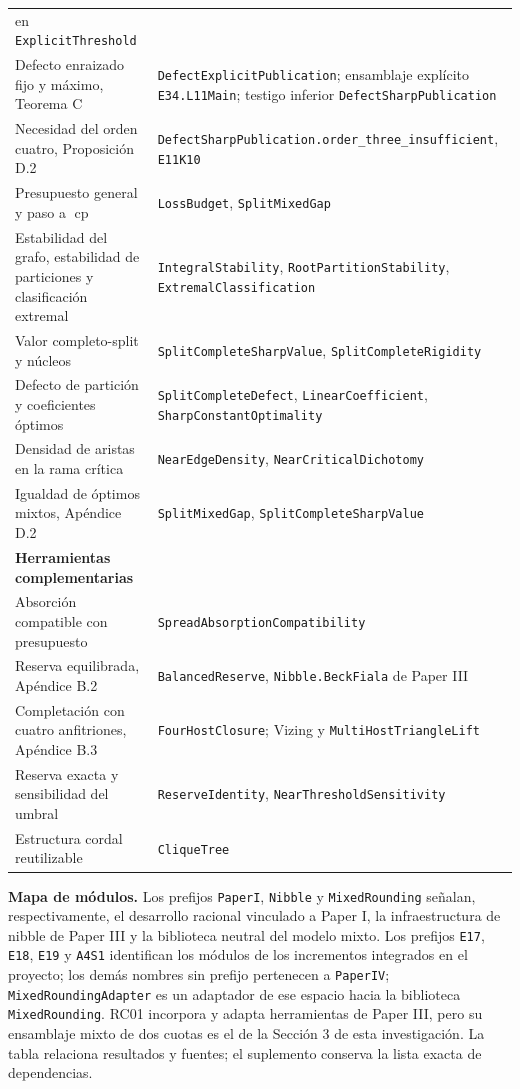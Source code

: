 \documentclass[spanish,11pt,a4paper]{article}
\begin{document}
{\begin{longtable}[]{@{}
  >{\raggedright\arraybackslash}p{}
  >{\raggedright\arraybackslash}p{}@{}}
en \nolinkurl{ExplicitThreshold} \\
Defecto enraizado fijo y máximo, Teorema C &
\nolinkurl{DefectExplicitPublication}; ensamblaje explícito
\nolinkurl{E34.L11Main}; testigo inferior
\nolinkurl{DefectSharpPublication} \\
Necesidad del orden cuatro, Proposición D.2 &
\nolinkurl{DefectSharpPublication.order_three_insufficient},
\nolinkurl{E11K10} \\
Presupuesto general y paso a \(\operatorname{cp}\) &
\nolinkurl{LossBudget}, \nolinkurl{SplitMixedGap} \\
Estabilidad del grafo, estabilidad de particiones y clasificación
extremal & \nolinkurl{IntegralStability}, \nolinkurl{RootPartitionStability},
\nolinkurl{ExtremalClassification} \\
Valor completo-split y núcleos & \nolinkurl{SplitCompleteSharpValue},
\nolinkurl{SplitCompleteRigidity} \\
Defecto de partición y coeficientes óptimos &
\nolinkurl{SplitCompleteDefect}, \nolinkurl{LinearCoefficient},
\nolinkurl{SharpConstantOptimality} \\
Densidad de aristas en la rama crítica & \nolinkurl{NearEdgeDensity},
\nolinkurl{NearCriticalDichotomy} \\
Igualdad de óptimos mixtos, Apéndice D.2 & \nolinkurl{SplitMixedGap},
\nolinkurl{SplitCompleteSharpValue} \\
\textbf{Herramientas complementarias} & \\
Absorción compatible con presupuesto &
\nolinkurl{SpreadAbsorptionCompatibility} \\
Reserva equilibrada, Apéndice B.2 & \nolinkurl{BalancedReserve},
\nolinkurl{Nibble.BeckFiala} de Paper III \\
Completación con cuatro anfitriones, Apéndice B.3 &
\nolinkurl{FourHostClosure}; Vizing y \nolinkurl{MultiHostTriangleLift} \\
Reserva exacta y sensibilidad del umbral & \nolinkurl{ReserveIdentity},
\nolinkurl{NearThresholdSensitivity} \\
Estructura cordal reutilizable & \nolinkurl{CliqueTree} \\
\end{longtable}
}

\textbf{Mapa de módulos.} Los prefijos \nolinkurl{PaperI}, \nolinkurl{Nibble}
y \nolinkurl{MixedRounding} señalan, respectivamente, el desarrollo
racional vinculado a Paper I, la infraestructura de nibble de Paper III
y la biblioteca neutral del modelo mixto. Los prefijos \nolinkurl{E17},
\nolinkurl{E18}, \nolinkurl{E19} y \nolinkurl{A4S1} identifican los módulos de
los incrementos integrados en el proyecto; los demás nombres sin prefijo
pertenecen a \nolinkurl{PaperIV}; \nolinkurl{MixedRoundingAdapter} es un
adaptador de ese espacio hacia la biblioteca \nolinkurl{MixedRounding}.
RC01 incorpora y adapta herramientas de Paper III, pero su ensamblaje
mixto de dos cuotas es el de la Sección 3 de esta investigación. La
tabla relaciona resultados y fuentes; el suplemento conserva la lista
exacta de dependencias.
\end{document}
